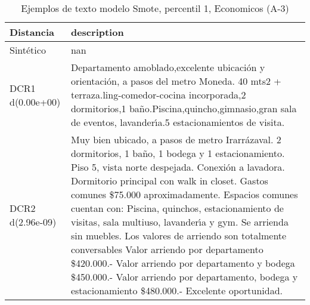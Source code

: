 \begin{table}[H]
\centering
\fontsize{10}{14}\selectfont
\caption{Ejemplos de texto modelo Smote, percentil 1, Economicos (A-3)}
\label{table-example-economicos-a-3-smote-enc-1p-text}
\begin{tabular}{|l|m{35em}|}
\hline
\rowcolor[gray]{0.8}
Distancia & description \\
\hline Sintético & nan \\
\hline DCR1 d(0.00e+00) & Departamento amoblado,excelente ubicaci\'on y orientaci\'on, a pasos del metro Moneda. 40 mts2 + terraza.ling-comedor-cocina incorporada,2 dormitorios,1 ba\~no.Piscina,quincho,gimnasio,gran sala de eventos, lavander{\'\i}a.5 estacionamientos de visita. \\
\hline DCR2 d(2.96e-09) & Muy bien ubicado, a pasos de metro Irarr\'azaval.   2 dormitorios, 1 ba\~no, 1 bodega y 1 estacionamiento.  Piso 5, vista norte despejada.   Conexi\'on a lavadora.   Dormitorio principal con walk in closet.  Gastos comunes \$75.000 aproximadamente.   Espacios comunes cuentan con: Piscina, quinchos, estacionamiento de visitas, sala multiuso, lavander{\'\i}a y gym.  Se arrienda sin muebles.  Los valores de arriendo son totalmente conversables Valor arriendo por departamento \$420.000.- Valor arriendo por departamento y bodega \$450.000.- Valor arriendo por departamento, bodega y estacionamiento \$480.000.-  Excelente oportunidad. \\
\hline
\end{tabular}
\end{table}
